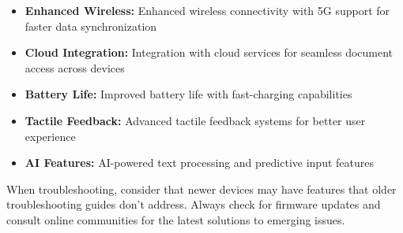 \begin{itemize}
	\item \textbf{Enhanced Wireless:} Enhanced wireless connectivity with 5G support for faster data synchronization
	\item \textbf{Cloud Integration:} Integration with cloud services for seamless document access across devices
	\item \textbf{Battery Life:} Improved battery life with fast-charging capabilities
	\item \textbf{Tactile Feedback:} Advanced tactile feedback systems for better user experience
	\item \textbf{AI Features:} AI-powered text processing and predictive input features
\end{itemize}

\begin{raggedright}
	When troubleshooting, consider that newer devices may have features that older troubleshooting guides don't address. Always check for firmware updates and consult online communities for the latest solutions to emerging issues.
\end{raggedright}

